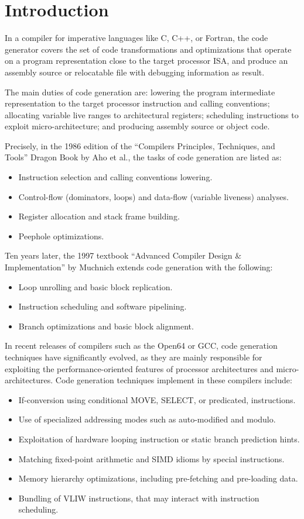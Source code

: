 \chapter{Introduction }
\label{chap:ssa-codegen}

In a compiler for imperative languages like C, C++, or Fortran, the code
generator covers the set of code transformations and optimizations that operate
on a program representation close to the target processor ISA, and produce an
assembly source or relocatable file with debugging information as result.

The main duties of code generation are: lowering the program intermediate
representation to the target processor instruction and calling conventions;
allocating variable live ranges to architectural registers; scheduling
instructions to exploit micro-architecture; and producing assembly source or
object code.

Precisely, in the 1986 edition of
the ``Compilers Principles, Techniques, and Tools'' Dragon Book by Aho et al.,
the tasks of code generation are listed as:
\begin{itemize}
\item Instruction selection and calling conventions lowering.
\item Control-flow (dominators, loops) and data-flow (variable liveness) analyses.
\item Register allocation and stack frame building.
\item Peephole optimizations.
\end{itemize}
Ten years later, the 1997 textbook ``Advanced Compiler Design \& Implementation''
by Muchnich extends code generation with the following: \begin{itemize}
\item Loop unrolling and basic block replication.
\item Instruction scheduling and software pipelining.
\item Branch optimizations and basic block alignment.
\end{itemize}
In recent releases of compilers such as the Open64 or GCC, code generation
techniques have significantly evolved, as they are mainly responsible for
exploiting the performance-oriented features of processor architectures and
micro-architectures. Code generation techniques implement in these compilers
include: \begin{itemize}
\item If-conversion using conditional MOVE, SELECT, or predicated, instructions.
\item Use of specialized addressing modes such as auto-modified and modulo.
\item Exploitation of hardware looping instruction or static branch prediction
hints.
\item Matching fixed-point arithmetic and SIMD idioms by special instructions.
\item Memory hierarchy optimizations, including pre-fetching and pre-loading
data.
\item Bundling of VLIW instructions, that may interact with instruction
scheduling.
\end{itemize}

